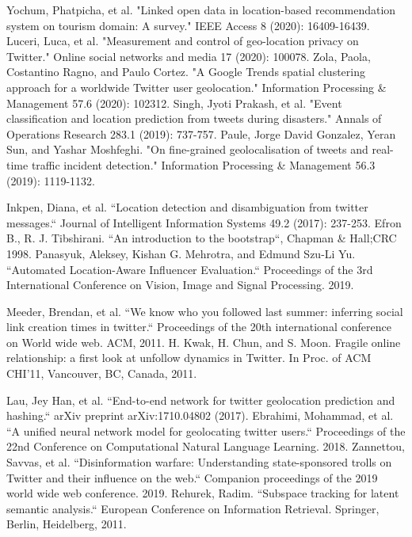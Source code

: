 \begin{thebibliography}{200}
 Yochum, Phatpicha, et al. "Linked open data in location-based recommendation system on tourism domain: A survey." IEEE Access 8 (2020): 16409-16439.\label{appendix:bookChNew3}
 Luceri, Luca, et al. "Measurement and control of geo-location privacy on Twitter." Online social networks and media 17 (2020): 100078.\label{appendix:bookChNew4}
 Zola, Paola, Costantino Ragno, and Paulo Cortez. "A Google Trends spatial clustering approach for a worldwide Twitter user geolocation." Information Processing \& Management 57.6 (2020): 102312.\label{appendix:bookChNew5}
 Singh, Jyoti Prakash, et al. "Event classification and location prediction from tweets during disasters." Annals of Operations Research 283.1 (2019): 737-757.\label{appendix:bookChNew7}
 Paule, Jorge David Gonzalez, Yeran Sun, and Yashar Moshfeghi. "On fine-grained geolocalisation of tweets and real-time traffic incident detection." Information Processing \& Management 56.3 (2019): 1119-1132.\label{appendix:bookChNew8}

 Inkpen, Diana, et al. ``Location detection and disambiguation from twitter messages.`` Journal of Intelligent Information Systems 49.2 (2017): 237-253.\label{appendix:bookCh23}
 Efron B., R. J. Tibshirani. ``An introduction to the bootstrap``, Chapman \& Hall;CRC 1998.\label{appendix:bookCh28}
 Panasyuk, Aleksey, Kishan G. Mehrotra, and Edmund Szu-Li Yu. ``Automated Location-Aware Influencer Evaluation.`` Proceedings of the 3rd International Conference on Vision, Image and Signal Processing. 2019.\label{appendix:bookCh29}

 Meeder, Brendan, et al. ``We know who you followed last summer: inferring social link creation times in twitter.`` Proceedings of the 20th international conference on World wide web. ACM, 2011.\label{appendix:5.15}
 H. Kwak, H. Chun, and S. Moon. Fragile online relationship: a first look at unfollow dynamics in Twitter. In Proc. of ACM CHI’11, Vancouver, BC, Canada, 2011.\label{appendix:5.16}

 Lau, Jey Han, et al. ``End-to-end network for twitter geolocation prediction and hashing.`` arXiv preprint arXiv:1710.04802 (2017).\label{appendix:6b.14}
 Ebrahimi, Mohammad, et al. ``A unified neural network model for geolocating twitter users.`` Proceedings of the 22nd Conference on Computational Natural Language Learning. 2018.\label{appendix:6b.15}
 Zannettou, Savvas, et al. ``Disinformation warfare: Understanding state-sponsored trolls on Twitter and their influence on the web.`` Companion proceedings of the 2019 world wide web conference. 2019.\label{appendix:6b.16}
 Rehurek, Radim. ``Subspace tracking for latent semantic analysis.`` European Conference on Information Retrieval. Springer, Berlin, Heidelberg, 2011.\label{appendix:6b.17}


\end{thebibliography}
